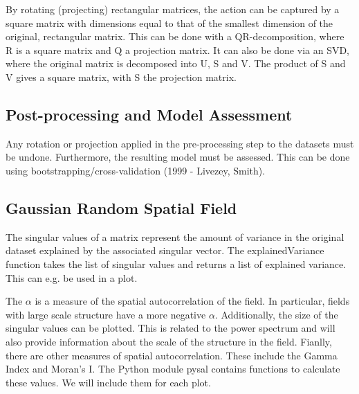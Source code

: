 \documentclass{acm_proc_article-sp}
\begin{document}
By rotating (projecting) rectangular matrices, the action can be captured by a square matrix with dimensions equal to that of the smallest dimension of the original, rectangular matrix. This can be done with a QR-decomposition, where R is a square matrix and Q a projection matrix. It can also be done via an SVD, where the original matrix is decomposed into U, S and V. The product of S and V gives a square matrix, with S the projection matrix.

\subsection{Post-processing and Model Assessment}
\label{sec:Introduction Post-processing and Model Assessment}

Any rotation or projection applied in the pre-processing step to the datasets must be undone. Furthermore, the resulting model must be assessed. This can be done using bootstrapping/cross-validation (1999 - Livezey, Smith).

\subsection{Gaussian Random Spatial Field}
\label{sec:Introduction Gaussian Random Spatial Field}

The singular values of a matrix represent the amount of variance in the original dataset explained by the associated singular vector. The explainedVariance function takes the list of singular values and returns a list of explained variance. This can e.g. be used in a plot.

The $\alpha$ is a measure of the spatial autocorrelation of the field. In particular, fields with large scale structure have a more negative $\alpha$. Additionally, the size of the singular values can be plotted. This is related to the power spectrum and will also provide information about the scale of the structure in the field. Fianlly, there are other measures of spatial autocorrelation. These include the Gamma Index and Moran's I. The Python module pysal contains functions to calculate these values. We will include them for each plot.
\end{document}
